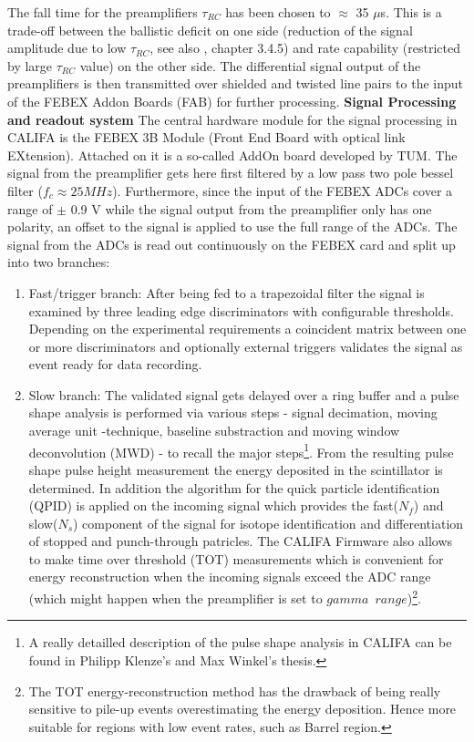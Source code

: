 The fall time for the preamplifiers $\tau_{RC}$ has been chosen to $\approx$ 35 $\mu$s. This is a trade-off between the ballistic deficit on one side (reduction of the signal amplitude due to low $\tau_{RC}$, see also \cite{winkel2011implementierung}, chapter 3.4.5) and rate capability (restricted by large $\tau_{RC}$ value) on the other side.\newline
The differential signal output of the preamplifiers is then transmitted over shielded and twisted line pairs to the input of the FEBEX Addon Boards (FAB) for further processing.\newline
\textbf{Signal Processing and readout system}\newline
The central hardware module for the signal processing in CALIFA is the FEBEX 3B Module (Front End Board with optical link EXtension\cite{febex-tec}). Attached on it is a so-called AddOn board developed by TUM. The signal from the preamplifier gets here first filtered by a low pass two pole bessel filter ($f_{c} \approx 25 MHz$). Furthermore, since the input of the FEBEX ADCs cover a range of $\pm$ 0.9 V while the signal output from the preamplifier only has one polarity, an offset to the signal is applied to use the full range of the ADCs. The signal from the ADCs is read out continuously on the FEBEX card and split up into two branches:\newline
\begin{enumerate}
\item Fast/trigger branch: After being fed to a trapezoidal filter the signal is examined by three leading edge discriminators with configurable thresholds. Depending on the experimental requirements a coincident matrix between one or more discriminators and optionally external triggers validates the signal as event ready for data recording.
\item Slow branch: The validated signal gets delayed over a ring buffer and a pulse shape analysis is performed via various steps - signal decimation, moving average unit -technique, baseline substraction and moving window deconvolution (MWD) - to recall the major steps\footnote{A really detailled description of the pulse shape analysis in CALIFA can be found in Philipp Klenze's\cite{pklenze} and Max Winkel's thesis\cite{winkel2016komplexe}.}. From the resulting pulse shape pulse height measurement the energy deposited in the scintillator is determined. In addition the algorithm for the quick particle identification (QPID) is applied on the incoming signal which provides the fast($N_{f}$) and slow($N_{s}$) component of the signal for isotope identification and differentiation of stopped and punch-through patricles. The CALIFA Firmware also allows to make time over threshold (TOT) measurements which is convenient for energy reconstruction when the incoming signals exceed the ADC range (which might happen when the preamplifier is set to $gamma \enspace range$)\footnote{The TOT energy-reconstruction method has the drawback of being really sensitive to pile-up events overestimating the energy deposition. Hence more suitable for regions with low event rates, such as Barrel region.}.
\end{enumerate}
